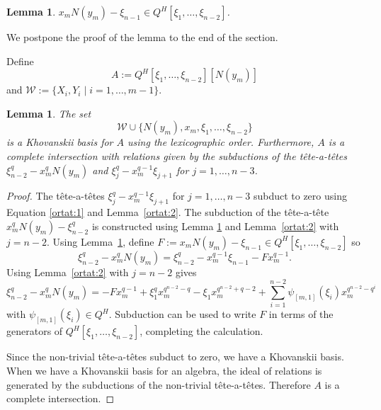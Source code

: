 \documentclass{amsart}
\newcommand{\tat}{t\^ete-a-t\^ete}
\newtheorem{lem}[subsection]{Lemma}
\begin{document}
\begin{lem} \label{ortat:3} $x_mN(y_m)-\xi_{n-1}\in Q^H[\xi_{1},\ldots,\xi_{n-2}]$.
  \end{lem}
We postpone the proof of the lemma to the end of the section. 
    
  Define $$A:=Q^H[\xi_{1},\ldots,\xi_{n-2}][N(y_m)]$$
  and
  $\mathcal{W}:=\{X_i,Y_i\mid i=1,\ldots,m-1\}$.
\begin{lem} \label{orKbasis} The set $$\mathcal{W}\cup\{N(y_m), x_m,\xi_{1},\dots,\xi_{n-2}\}$$
is a Khovanskii basis for $A$ using the lexicographic order.
Furthermore, $A$ is a complete intersection with relations given by the subductions of the \tat s
$\xi_{n-2}^q-x_m^qN(y_m)$ and $\xi_{j}^q-x_m^{q-1}\xi_{j+1}$ for $j=1,\ldots,n-3$.
\end{lem}
\begin{proof}
The \tat s $\xi_{j}^q-x_m^{q-1}\xi_{j+1}$ for $j=1,\ldots, n-3$ subduct to zero using Equation \ref{ortat:1} and Lemma~\ref{ortat:2}.
The subduction of the \tat\ $x_m^qN(y_m)-\xi_{n-2}^q$ is constructed using 
Lemma \ref{ortat:3} and Lemma~\ref{ortat:2} with $j= n-2$. 
Using Lemma~\ref{ortat:3}, define 
$F:=x_mN(y_m)-\xi_{n-1}\in Q^H[\xi_{1},\ldots,\xi_{n-2}]$
so $$\xi_{n-2}^q-x_m^qN(y_m)=\xi_{n-2}^q-x_m^{q-1}\xi_{n-1}-Fx_m^{q-1}.$$
Using Lemma~\ref{ortat:2} with $j=n-2$ gives
$$\xi_{n-2}^q-x_m^qN(y_m)=-Fx_m^{q-1}+\xi_1^qx_m^{q^{n-2}-q}-\xi_1x_m^{q^{n-2}+q-2}
+\sum_{i=1}^{n-2}\psi_{[m,1]}(\xi_i)x_m^{q^{n-2}-q^i}$$
with $\psi_{[m,1]}(\xi_i)\in Q^H$.
Subduction can be used to write
$F$ in terms of the generators of  $Q^H[\xi_{1},\ldots,\xi_{n-2}]$,
completing the calculation. 

Since the non-trivial \tat s subduct to zero, we have a Khovanskii basis.
When we have a Khovanskii basis for an algebra, the ideal of relations is generated by the subductions of the non-trivial \tat s. Therefore $A$ is a complete intersection.
\end{proof}
\end{document}
